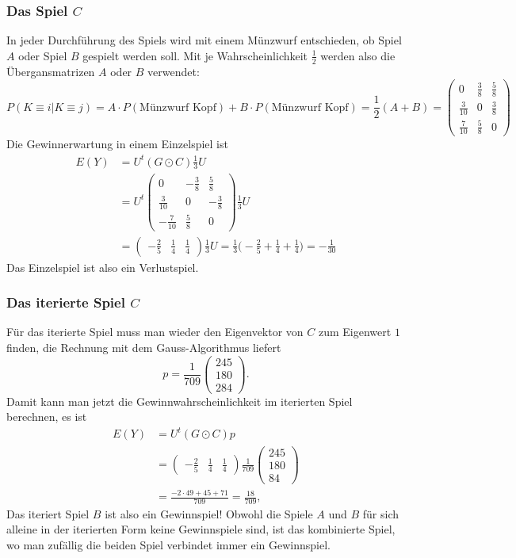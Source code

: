 \subsubsection{Das Spiel $C$}
In jeder Durchführung des Spiels wird mit einem Münzwurf entschieden,
ob Spiel $A$ oder Spiel $B$ gespielt werden soll.
Mit je Wahrscheinlichkeit $\frac12$ werden also die Übergansmatrizen
$A$ oder $B$ verwendet:
\[
P(K\equiv i|K\equiv j)
=
A\cdot P(\text{Münzwurf Kopf})
+
B\cdot P(\text{Münzwurf Kopf})
=
\frac12(A+B)
=
\begin{pmatrix}
0            & \frac{3}{8} & \frac{5}{8} \\
\frac{3}{10} & 0           & \frac{3}{8} \\
\frac{7}{10} & \frac{5}{8} & 0
\end{pmatrix}
\]
Die Gewinnerwartung in einem Einzelspiel ist
\begin{align*}
E(Y)
&=
U^t
(G\odot C)
\frac13U
\\
&=
U^t
\begin{pmatrix}
 0            &-\frac{3}{8} & \frac{5}{8} \\
 \frac{3}{10} & 0           &-\frac{3}{8} \\
-\frac{7}{10} & \frac{5}{8} & 0
\end{pmatrix}
\frac13U
\\
&=
\begin{pmatrix}
-\frac{2}{5} & \frac{1}{4} & \frac{1}{4}
\end{pmatrix}
\frac13U
=
\frac13\biggl(-\frac{2}{5}+\frac{1}{4}+\frac{1}{4}\biggr)
=
-\frac{1}{30}
\end{align*}
Das Einzelspiel ist also ein Verlustspiel.

\subsubsection{Das iterierte Spiel $C$}
Für das iterierte Spiel muss man wieder den Eigenvektor von $C$ zum
Eigenwert $1$ finden, die Rechnung mit dem Gauss-Algorithmus liefert
\[
p=
\frac{1}{709}
\begin{pmatrix}
245\\180\\284
\end{pmatrix}.
\]
Damit kann man jetzt die Gewinnwahrscheinlichkeit im iterierten Spiel
berechnen, es ist
\begin{align*}
E(Y)
&=
U^t
(G\odot C) p
\\
&=
\begin{pmatrix}
-\frac{2}{5} & \frac{1}{4} & \frac{1}{4}
\end{pmatrix}
\frac{1}{709}
\begin{pmatrix}
245\\180\\84
\end{pmatrix}
\\
&=
\frac{
-2\cdot 49 + 45 + 71
}{709}
=
\frac{18}{709},
\end{align*}
Das iteriert Spiel $B$ ist also ein Gewinnspiel!
Obwohl die Spiele $A$ und $B$ für sich alleine in der iterierten Form
keine Gewinnspiele sind, ist das kombinierte Spiel, wo man zufällig
die beiden Spiel verbindet immer ein Gewinnspiel.

